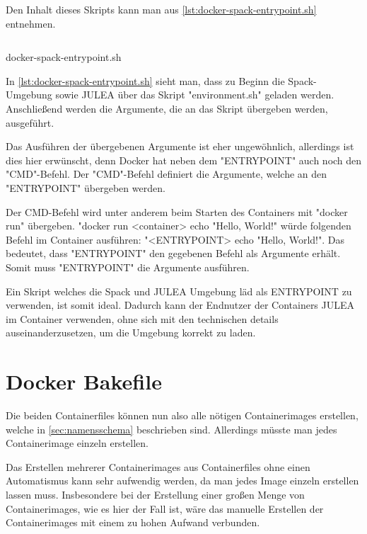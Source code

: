 Den Inhalt dieses Skripts kann man aus \cref{lst:docker-spack-entrypoint.sh} entnehmen.

\begin{listing}[H]
    \inputminted{bash}{./code-examples/docker-spack-entrypoint.sh}
    \caption{docker-spack-entrypoint.sh}
    \label{lst:docker-spack-entrypoint.sh}
\end{listing}

In \cref{lst:docker-spack-entrypoint.sh} sieht man, dass zu Beginn die Spack-Umgebung sowie JULEA über das Skript "environment.sh" geladen werden.
Anschließend werden die Argumente, die an das Skript übergeben werden, ausgeführt.

Das Ausführen der übergebenen Argumente ist eher ungewöhnlich, allerdings ist dies hier erwünscht, denn Docker hat neben dem "ENTRYPOINT" auch noch den "CMD"-Befehl. Der "CMD"-Befehl definiert die Argumente, welche an den "ENTRYPOINT" übergeben werden. 

Der CMD-Befehl wird unter anderem beim Starten des Containers mit "docker run" übergeben. "docker run <container> echo "Hello, World!" würde folgenden Befehl im Container ausführen: "<ENTRYPOINT> echo "Hello, World!". Das bedeutet, dass "ENTRYPOINT" den gegebenen Befehl als Argumente erhält. Somit muss "ENTRYPOINT" die Argumente ausführen.

Ein Skript welches die Spack und JULEA Umgebung läd als ENTRYPOINT zu verwenden, ist somit ideal. Dadurch kann der Endnutzer der Containers JULEA im Container verwenden, ohne sich mit den technischen details auseinanderzusetzen, um die Umgebung korrekt zu laden.

\pagebreak

\section{Docker Bakefile} \label{sec:docker-bake}

Die beiden Containerfiles können nun also alle nötigen Containerimages erstellen, welche in \cref{sec:namensschema} beschrieben sind. Allerdings müsste man jedes Containerimage einzeln erstellen.

Das Erstellen mehrerer Containerimages aus Containerfiles ohne einen Automatismus kann sehr aufwendig werden, da man jedes Image einzeln erstellen lassen muss. Insbesondere bei der Erstellung einer großen Menge von Containerimages, wie es hier der Fall ist, wäre das manuelle Erstellen der Containerimages mit einem zu hohen Aufwand verbunden. 

